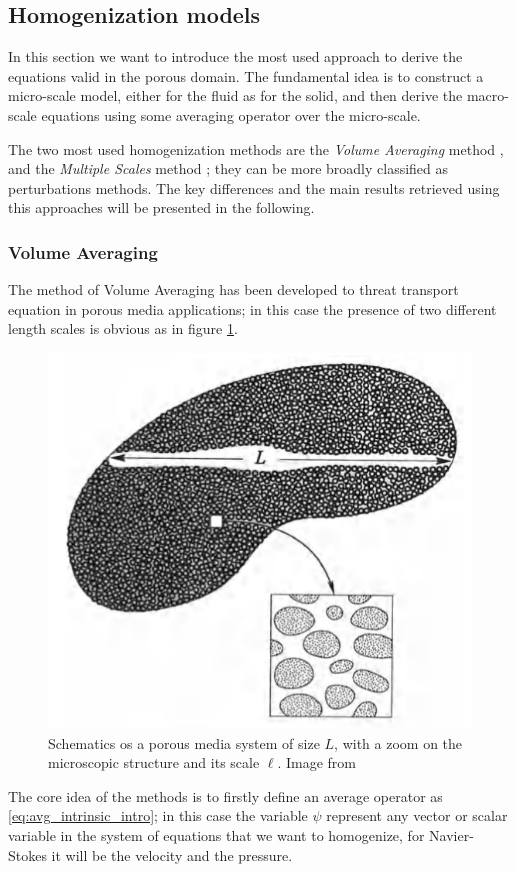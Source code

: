 \subsection{Homogenization models}

In this section we want to introduce the most used approach to derive the equations valid in the porous domain.
The fundamental idea is to construct a micro-scale model, either for the fluid as for the solid, and then derive the macro-scale equations using some averaging operator over the micro-scale.

The two most used homogenization methods are the \textit{Volume Averaging} method \citet{whitaker2013method}, and the \textit{Multiple Scales} method \citet{mei2010homogenization}; they can be more broadly classified as perturbations methods. 
The key differences and the main results retrieved using this approaches will be presented in the following.


\subsubsection{Volume Averaging}
\label{sec:vans}

The method of Volume Averaging has been developed to threat transport equation in porous media applications; in this case the presence of two different length scales is obvious as in figure \ref{fig:porsystem}.
	
	\begin{figure}[h]
		\centering
		\includegraphics[width=0.5\linewidth]{chapter_1/por_system}
		\caption{Schematics os a porous media system of size $L$, with a zoom on the microscopic structure and its scale $\ell$. Image from \citet{whitaker2013method}}
		\label{fig:porsystem}
	\end{figure}

The core idea of the methods is to firstly define an average operator as \eqref{eq:avg_intrinsic_intro}; in this case the variable $\psi$ represent any vector or scalar variable in the system of equations that we want to homogenize, for Navier-Stokes it will be the velocity and the pressure.

